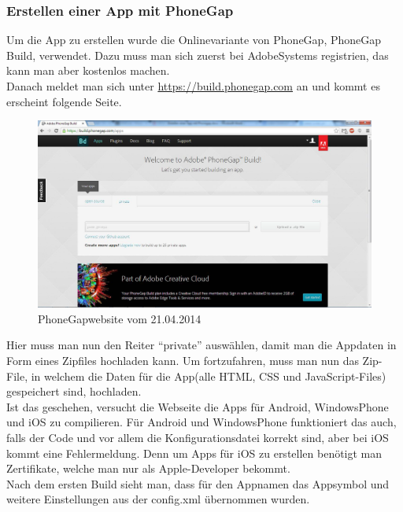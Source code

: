 \newpage
\subsubsection{Erstellen einer App mit PhoneGap}
Um die App zu erstellen wurde die Onlinevariante von PhoneGap, PhoneGap Build, verwendet. Dazu muss man sich zuerst bei AdobeSystems registrien, das kann man aber kostenlos machen.\\
Danach meldet man sich unter \href{https://build.phonegap.com}{https://build.phonegap.com} an und kommt es erscheint folgende Seite.\\

\begin{figure}[H]
\centering
\includegraphics[keepaspectratio=true, width=14cm]{images/phoneGap/PhoneGap1.png}
\caption{PhoneGapwebsite vom 21.04.2014}
\end{figure}

Hier muss man nun den Reiter \enquote{private} auswählen, damit man die Appdaten in Form eines Zipfiles hochladen kann.
Um fortzufahren, muss man nun das Zip-File, in welchem die Daten für die App(alle HTML, CSS und JavaScript-Files) gespeichert sind, hochladen.\\
Ist das geschehen, versucht die Webseite die Apps für Android, WindowsPhone und iOS zu compilieren. Für Android und WindowsPhone funktioniert das auch, falls der Code und vor allem die Konfigurationsdatei korrekt sind, aber bei iOS kommt eine Fehlermeldung. Denn um Apps für iOS zu erstellen benötigt man Zertifikate, welche man nur als Apple-Developer bekommt.\\
Nach dem ersten Build sieht man, dass für den Appnamen das Appsymbol und weitere Einstellungen aus der config.xml übernommen wurden.\\


